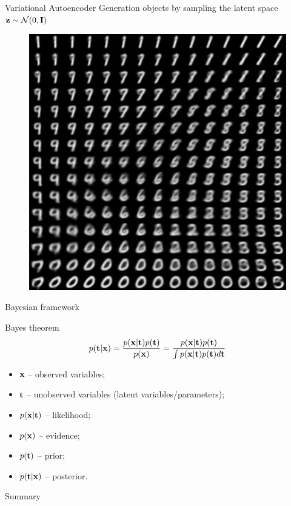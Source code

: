 \begin{frame}{Variational Autoencoder}
Generation objects by sampling the latent space $\mathbf{z} \sim \mathcal{N}(0, \mathbf{I})$
\begin{figure}[h]
	\centering
	\includegraphics[width=.5\linewidth]{figs/vae_0.png}
\end{figure}
\end{frame}
\begin{frame}{Bayesian framework}
\begin{block}{Bayes theorem}
	\[
	p(\mathbf{t} | \mathbf{x}) = \frac{p(\mathbf{x} | \mathbf{t}) p(\mathbf{t})}{p(\mathbf{x})} = \frac{p(\mathbf{x} | \mathbf{t}) p(\mathbf{t})}{\int p(\mathbf{x} | \mathbf{t}) p(\mathbf{t}) d \mathbf{t}} 
	\]
	\begin{itemize}
		\item $\mathbf{x}$ -- observed variables;
		\item $\mathbf{t}$ -- unobserved variables (latent variables/parameters);
		\item $p(\mathbf{x} | \mathbf{t})$ -- likelihood;
		\item $p(\mathbf{x})$ -- evidence;
		\item $p(\mathbf{t})$ -- prior;
		\item $p(\mathbf{t} | \mathbf{x})$ -- posterior.
	\end{itemize}
\end{block}
\end{frame}
\begin{frame}{Summary}
\end{frame}
 